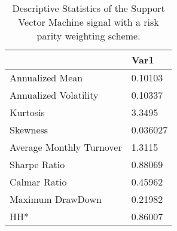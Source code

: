 \begin{table}[H]
\centering
\begin{tabular}{ll}
\hline& Var1 \\ 
\hline 
Annualized Mean & 0.10103 \\ 
Annualized Volatility & 0.10337 \\ 
Kurtosis & 3.3495 \\ 
Skewness & 0.036027 \\ 
Average Monthly Turnover & 1.3115 \\ 
Sharpe Ratio & 0.88069 \\ 
Calmar Ratio & 0.45962 \\ 
Maximum DrawDown & 0.21982 \\ 
HH* & 0.86007 \\ 
\hline
\end{tabular}
\caption{Descriptive Statistics of the Support Vector Machine signal with a risk parity weighting scheme.}
\label{SVM_MODEL_Risk}
\end{table}